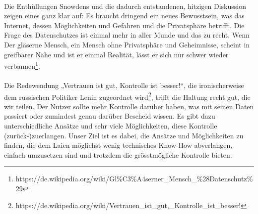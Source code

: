 \\
Die Enthüllungen Snowdens und die dadurch entstandenen, hitzigen Diskussion zeigen eines ganz klar auf: Es braucht dringend ein neues Bewusstsein, was das Internet, dessen Möglichkeiten und Gefahren und die Privatsphäre betrifft. Die Frage des Datenschutzes ist einmal mehr in aller Munde und das zu recht. Wenn  Der gläserne Mensch, ein Mensch ohne Privatsphäre und Geheimnisse, scheint in greifbarer Nähe und ist er einmal Realität, lässt er sich nur schwer wieder verbannen\footnote{https://de.wikipedia.org/wiki/Gl\%C3\%A4serner_Mensch_\%28Datenschutz\%29}.
\\
\\
Die Redewendung „Vertrauen ist gut, Kontrolle ist besser!“, die ironischerweise dem russischen Politiker Lenin zugeordnet wird\footnote{https://de.wikipedia.org/wiki/Vertrauen_ist_gut,_Kontrolle_ist_besser!}, trifft die Haltung recht gut, die wir teilen. Der Nutzer sollte mehr Kontrolle darüber haben, was mit seinen Daten passiert oder zumindest genau darüber Bescheid wissen. Es gibt dazu unterschiedliche Ansätze und sehr viele Möglichkeiten, diese Kontrolle (zurück-)zuerlangen. Unser Ziel ist es dabei, die Ansätze und Möglichkeiten zu finden, die dem Laien möglichst wenig technisches Know-How abverlangen, einfach umzusetzen sind und trotzdem die grösstmögliche Kontrolle bieten.
